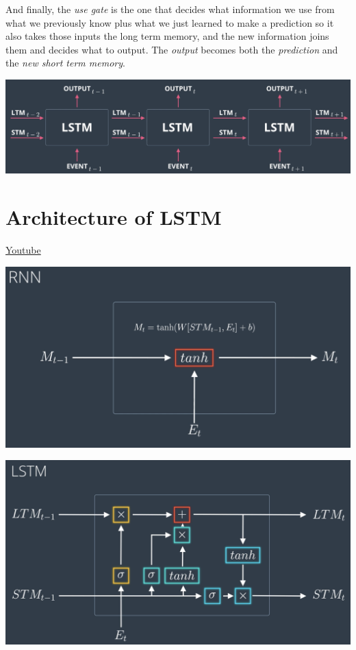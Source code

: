 And finally, the \textit{use gate} is the one that decides what information we use from what we previously know plus what we just learned to make a prediction so it also takes those inputs the long term memory,
and the new information joins them and decides what to output.
The \textit{output} becomes both the \textit{prediction} and the \textit{new short term memory}.

\includegraphics[width=1\linewidth]{img//rnn//lstm/basicsoflstm_general.png}


\section{Architecture of LSTM}
\href{https://www.youtube.com/watch?v=ycwthhdx8ws&t=4s&ab_channel=Udacity}{Youtube}

\includegraphics[width=1\linewidth]{img//rnn//lstm/rnnArchitecture.png}

\includegraphics[width=1\linewidth]{img//rnn//lstm/lstmArchitecture.png}

